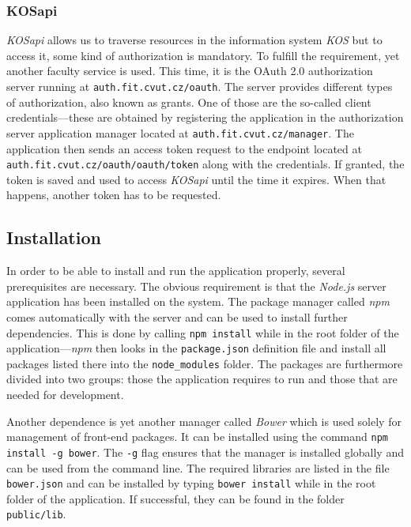 \documentclass[thesis=M,english,hidelinks]{FITthesis}[2012/10/20]
\newcommand{\code}{\texttt}
\begin{document}
      \subsubsection{KOSapi}

\textit{KOSapi} allows us to traverse resources in the information system \textit{KOS} but to access it, some kind of authorization is mandatory. To fulfill the requirement, yet another faculty service is used. This time, it is the OAuth 2.0 authorization server running at \code{auth.fit.cvut.cz/oauth}. The server provides different types of authorization, also known as grants. One of those are the so-called client credentials---these are obtained by registering the application in the authorization server application manager located at \code{auth.fit.cvut.cz/manager}. The application then sends an access token request to the endpoint located at \code{auth.fit.cvut.cz/oauth/oauth/token} along with the credentials. If granted, the token is saved and used to access \textit{KOSapi} until the time it expires. When that happens, another token has to be requested.

    \subsection{Installation}

In order to be able to install and run the application properly, several prerequisites are necessary. The obvious requirement is that the \textit{Node.js} server application has been installed on the system. The package manager called \textit{npm} comes automatically with the server and can be used to install further dependencies. This is done by calling \code{npm install} while in the root folder of the application---\textit{npm} then looks in the \code{package.json} definition file and install all packages listed there into the \code{node\_modules} folder. The packages are furthermore divided into two groups: those the application requires to run and those that are needed for development.

Another dependence is yet another manager called \textit{Bower} \cite{bower} which is used solely for management of front-end packages. It can be installed using the command \code{npm install -g bower}. The \code{-g} flag ensures that the manager is installed globally and can be used from the command line. The required libraries are listed in the file \code{bower.json} and can be installed by typing \code{bower install} while in the root folder of the application. If successful, they can be found in the folder \code{public/lib}.
\end{document}
